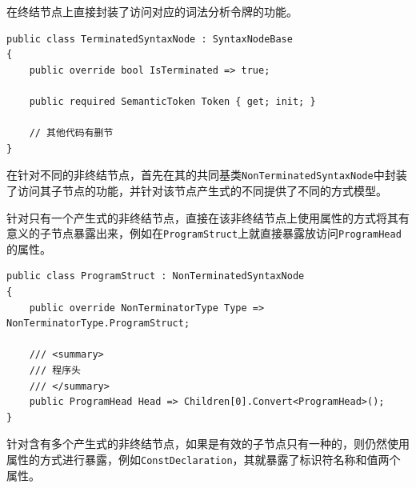 \documentclass[../main.tex]{subfiles}
\begin{document}
在终结节点上直接封装了访问对应的词法分析令牌的功能。

\begin{lstlisting}[style=csharp]
public class TerminatedSyntaxNode : SyntaxNodeBase
{
    public override bool IsTerminated => true;

    public required SemanticToken Token { get; init; }

    // 其他代码有删节
}
\end{lstlisting}

在针对不同的非终结节点，首先在其的共同基类\texttt{NonTerminatedSyntaxNode}中封装了访问其子节点的功能，并针对该节点产生式的不同提供了不同的方式模型。

针对只有一个产生式的非终结节点，直接在该非终结节点上使用属性的方式将其有意义的子节点暴露出来，例如在\texttt{ProgramStruct}上就直接暴露放访问\texttt{ProgramHead}的属性。

\begin{lstlisting}[style=csharp]
public class ProgramStruct : NonTerminatedSyntaxNode
{
    public override NonTerminatorType Type => NonTerminatorType.ProgramStruct;

    /// <summary>
    /// 程序头
    /// </summary>
    public ProgramHead Head => Children[0].Convert<ProgramHead>();
}
\end{lstlisting}

针对含有多个产生式的非终结节点，如果是有效的子节点只有一种的，则仍然使用属性的方式进行暴露，例如\texttt{ConstDeclaration}，其就暴露了标识符名称和值两个属性。
\end{document}
